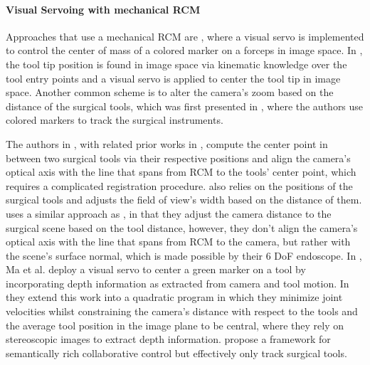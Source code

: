 \paragraph{Visual Servoing with mechanical RCM}
Approaches that use a mechanical RCM are \cite{omote1999self}, where a visual servo is implemented to control the center of mass of a colored marker on a forceps in image space. In \cite{agustinos2014visual, voros2007automatic}, the tool tip position is found in image space via kinematic knowledge over the tool entry points and a visual servo is applied to center the tool tip in image space. Another common scheme is to alter the camera's zoom based on the distance of the surgical tools, which was first presented in \cite{king2013towards}, where the authors use colored markers to track the surgical instruments.

The authors in \cite{eslamian2020development, mariani2020experimental, da2020scan}, with related prior works in \cite{Eslamian2016TowardsTI, eslamian2017autonomous}, compute the center point in between two surgical tools via their respective positions and align the camera's optical axis with the line that spans from RCM to the tools' center point, which requires a complicated registration procedure. \cite{yu2016automatic} also relies on the positions of the surgical tools and adjusts the field of view's width based on the distance of them. \cite{abdelaal2020orientation} uses a similar approach as \cite{eslamian2020development}, in that they adjust the camera distance to the surgical scene based on the tool distance, however, they don't align the camera's optical axis with the line that spans from RCM to the camera, but rather with the scene's surface normal, which is made possible by their 6 DoF endoscope. In \cite{ma2019autonomous}, Ma et al. deploy a visual servo to center a green marker on a tool by incorporating depth information as extracted from camera and tool motion. In \cite{ma2020visual} they extend this work into a quadratic program in which they minimize joint velocities whilst constraining the camera's distance with respect to the tools and the average tool position in the image plane to be central, where they rely on stereoscopic images to extract depth information. \cite{gruijthuijsen2021autonomous} propose a framework for semantically rich collaborative control but effectively only track surgical tools.

